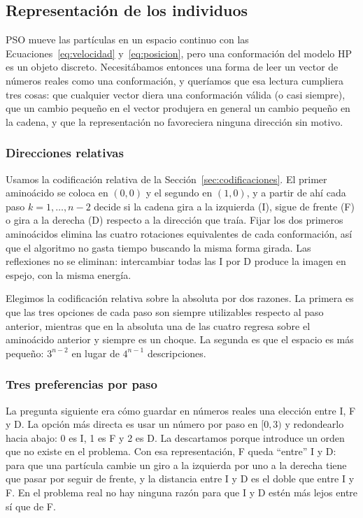 \subsection{Representación de los individuos}
\label{sec:representacion}

PSO mueve las partículas en un espacio continuo con las Ecuaciones~\eqref{eq:velocidad} y~\eqref{eq:posicion}, pero una conformación del modelo HP es un objeto discreto. Necesitábamos entonces una forma de leer un vector de números reales como una conformación, y queríamos que esa lectura cumpliera tres cosas: que cualquier vector diera una conformación válida (o casi siempre), que un cambio pequeño en el vector produjera en general un cambio pequeño en la cadena, y que la representación no favoreciera ninguna dirección sin motivo.

\subsubsection{Direcciones relativas}

Usamos la codificación relativa de la Sección~\ref{sec:codificaciones}. El primer aminoácido se coloca en $(0,0)$ y el segundo en $(1,0)$, y a partir de ahí cada paso $k = 1, \dots, n-2$ decide si la cadena gira a la izquierda (I), sigue de frente (F) o gira a la derecha (D) respecto a la dirección que traía. Fijar los dos primeros aminoácidos elimina las cuatro rotaciones equivalentes de cada conformación, así que el algoritmo no gasta tiempo buscando la misma forma girada. Las reflexiones no se eliminan: intercambiar todas las I por D produce la imagen en espejo, con la misma energía.

Elegimos la codificación relativa sobre la absoluta por dos razones. La primera es que las tres opciones de cada paso son siempre utilizables respecto al paso anterior, mientras que en la absoluta una de las cuatro regresa sobre el aminoácido anterior y siempre es un choque. La segunda es que el espacio es más pequeño: $3^{n-2}$ en lugar de $4^{n-1}$ descripciones.

\subsubsection{Tres preferencias por paso}

La pregunta siguiente era cómo guardar en números reales una elección entre I, F y D. La opción más directa es usar un número por paso en $[0,3)$ y redondearlo hacia abajo: 0 es I, 1 es F y 2 es D. La descartamos porque introduce un orden que no existe en el problema. Con esa representación, F queda ``entre'' I y D: para que una partícula cambie un giro a la izquierda por uno a la derecha tiene que pasar por seguir de frente, y la distancia entre I y D es el doble que entre I y F. En el problema real no hay ninguna razón para que I y D estén más lejos entre sí que de F.

